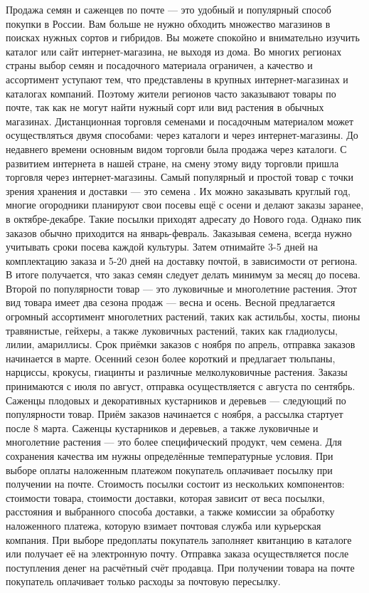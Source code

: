 Продажа семян и саженцев по почте — это удобный и популярный способ покупки в России. Вам больше не нужно обходить множество магазинов в поисках нужных сортов и гибридов. Вы можете спокойно и внимательно изучить каталог или сайт интернет-магазина, не выходя из дома.
Во многих регионах страны выбор семян и посадочного материала ограничен, а качество и ассортимент уступают тем, что представлены в крупных интернет-магазинах и каталогах компаний. Поэтому жители регионов часто заказывают товары по почте, так как не могут найти нужный сорт или вид растения в обычных магазинах.
Дистанционная торговля семенами и посадочным материалом может осуществляться двумя способами: через каталоги и через интернет-магазины. До недавнего времени основным видом торговли была продажа через каталоги. С развитием интернета в нашей стране, на смену этому виду торговли пришла торговля через интернет-магазины.
Самый популярный и простой товар с точки зрения хранения и доставки — это семена \cite{krivko}. Их можно заказывать круглый год, многие огородники планируют свои посевы ещё с осени и делают заказы заранее, в октябре-декабре. Такие посылки приходят адресату до Нового года. Однако пик заказов обычно приходится на январь-февраль. Заказывая семена, всегда нужно учитывать сроки посева каждой культуры. Затем отнимайте 3-5 дней на комплектацию заказа и 5-20 дней на доставку почтой, в зависимости от региона. В итоге получается, что заказ семян следует делать минимум за месяц до посева.
Второй по популярности товар — это луковичные и многолетние растения. Этот вид товара имеет два сезона продаж — весна и осень. Весной предлагается огромный ассортимент многолетних растений, таких как астильбы, хосты, пионы травянистые, гейхеры, а также луковичных растений, таких как гладиолусы, лилии, амариллисы. Срок приёмки заказов с ноября по апрель, отправка заказов начинается в марте. Осенний сезон более короткий и предлагает тюльпаны, нарциссы, крокусы, гиацинты и различные мелколуковичные растения. Заказы принимаются с июля по август, отправка осуществляется с августа по сентябрь.
Саженцы плодовых и декоративных кустарников и деревьев — следующий по популярности товар. Приём заказов начинается с ноября, а рассылка стартует после 8 марта.
Саженцы кустарников и деревьев, а также луковичные и многолетние растения — это более специфический продукт, чем семена. Для сохранения качества им нужны определённые температурные условия.
При выборе оплаты наложенным платежом покупатель оплачивает посылку при получении на почте. Стоимость посылки состоит из нескольких компонентов: стоимости товара, стоимости доставки, которая зависит от веса посылки, расстояния и выбранного способа доставки, а также комиссии за обработку наложенного платежа, которую взимает почтовая служба или курьерская компания.
При выборе предоплаты покупатель заполняет квитанцию в каталоге или получает её на электронную почту. Отправка заказа осуществляется после поступления денег на расчётный счёт продавца. При получении товара на почте покупатель оплачивает только расходы за почтовую пересылку.

